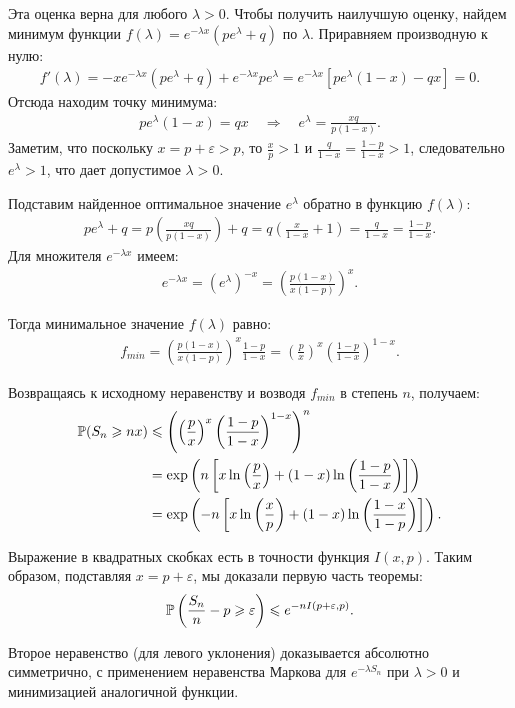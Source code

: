 \begin{proofbox}
    Эта оценка верна для любого $\lambda > 0$. Чтобы получить наилучшую оценку, найдем минимум функции $f(\lambda) = e^{-\lambda x} (p e^\lambda + q)$ по $\lambda$. 
    Приравняем производную к нулю:
    \begin{align*}
        f'(\lambda) = -x e^{-\lambda x} (p e^\lambda + q) + e^{-\lambda x} p e^\lambda = e^{-\lambda x} \left[ p e^\lambda (1 - x) - q x \right] = 0.
    \end{align*}
    Отсюда находим точку минимума:
    \begin{align*}
        p e^\lambda (1 - x) = q x \quad \Rightarrow \quad e^\lambda = \frac{x q}{p (1 - x)}.
    \end{align*}
    Заметим, что поскольку $x = p + \varepsilon > p$, то $\frac{x}{p} > 1$ и $\frac{q}{1-x} = \frac{1-p}{1-x} > 1$, следовательно $e^\lambda > 1$, что дает допустимое $\lambda > 0$.

    Подставим найденное оптимальное значение $e^\lambda$ обратно в функцию $f(\lambda)$:
    \begin{align*}
        p e^\lambda + q = p \left( \frac{x q}{p (1 - x)} \right) + q = q \left( \frac{x}{1-x} + 1 \right) = \frac{q}{1-x} = \frac{1-p}{1-x}.
    \end{align*}
    Для множителя $e^{-\lambda x}$ имеем:
    \begin{align*}
        e^{-\lambda x} = (e^\lambda)^{-x} = \left( \frac{p (1 - x)}{x (1 - p)} \right)^x.
    \end{align*}

    Тогда минимальное значение $f(\lambda)$ равно:
    \begin{align*}
        f_{min} = \left( \frac{p (1 - x)}{x (1 - p)} \right)^x \frac{1-p}{1-x} = \left( \frac{p}{x} \right)^x \left( \frac{1-p}{1-x} \right)^{1-x}.
    \end{align*}

    Возвращаясь к исходному неравенству и возводя $f_{min}$ в степень $n$, получаем:
    \begin{align*}
        \P(S_n \geqslant nx) &\leqslant \left( \left( \frac{p}{x} \right)^x \left( \frac{1-p}{1-x} \right)^{1-x} \right)^n \\
        &= \exp\left( n \left[ x \ln\left(\frac{p}{x}\right) + (1-x) \ln\left(\frac{1-p}{1-x}\right) \right] \right) \\
        &= \exp\left( -n \left[ x \ln\left(\frac{x}{p}\right) + (1-x) \ln\left(\frac{1-x}{1-p}\right) \right] \right).
    \end{align*}
    
    Выражение в квадратных скобках есть в точности функция $I(x, p)$. Таким образом, подставляя $x = p + \varepsilon$, мы доказали первую часть теоремы:
    \begin{align*}
        \P\left( \frac{S_n}{n} - p \geqslant \varepsilon \right) \leqslant e^{-n I(p+\varepsilon, p)}.
    \end{align*}

    Второе неравенство (для левого уклонения) доказывается абсолютно симметрично, с применением неравенства Маркова для $e^{-\lambda S_n}$ при $\lambda > 0$ и минимизацией аналогичной функции. 
\end{proofbox}


